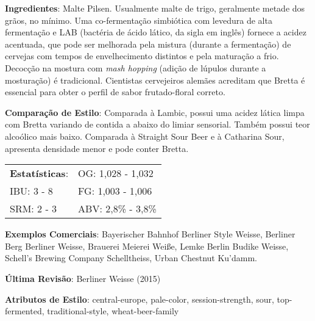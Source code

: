 \textbf{Ingredientes}: Malte Pilsen. Usualmente malte de trigo, geralmente metade dos grãos, no mínimo. Uma co-fermentação simbiótica com levedura de alta fermentação e LAB (bactéria de ácido lático, da sigla em inglês) fornece a acidez acentuada, que pode ser melhorada pela mistura (durante a fermentação) de cervejas com tempos de envelhecimento distintos e pela maturação a frio. Decocção na mostura com \textit{mash hopping} (adição de lúpulos durante a mosturação) é tradicional. Cientistas cervejeiros alemães acreditam que Bretta é essencial para obter o perfil de sabor frutado-floral correto.

\textbf{Comparação de Estilo}: Comparada à Lambic, possui uma acidez lática limpa com Bretta variando de contida a abaixo do limiar sensorial. Também possui teor alcoólico mais baixo. Comparada à Straight Sour Beer e à Catharina Sour, apresenta densidade menor e pode conter Bretta.

\begin{tabular}{@{}p{35mm}p{35mm}@{}}
  \textbf{Estatísticas}: & OG: 1,028 - 1,032 \\
  IBU: 3 - 8  & FG: 1,003 - 1,006  \\
  SRM: 2 - 3  & ABV: 2,8\% - 3,8\%
\end{tabular}

\textbf{Exemplos Comerciais}: Bayerischer Bahnhof Berliner Style Weisse, Berliner Berg Berliner Weisse, Brauerei Meierei Weiße, Lemke Berlin Budike Weisse, Schell's Brewing Company Schelltheiss, Urban Chestnut Ku’damm.

\textbf{Última Revisão}: Berliner Weisse (2015)

\textbf{Atributos de Estilo}: central-europe, pale-color, session-strength, sour, top-fermented, traditional-style, wheat-beer-family
